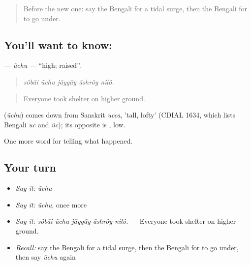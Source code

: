 \label{lesson:BN-C289-uchu}



\begin{quote}
Before the new one: say the Bengali for a tidal surge, then the Bengali for to go under.
\end{quote}

\subsection*{You'll want to know: }
\textbf{} — \emph{ũchu} — \textquotedblleft{}high; raised\textquotedblright{}.

\begin{quote}
    
\end{quote}

\begin{quote}
\emph{sôbāi ũchu jāygāy āshrôy nilô.}
\end{quote}

\begin{quote}
Everyone took shelter on higher ground.
\end{quote}

\begin{cousinweb}
\textbf{} (\emph{ũchu}) comes down from Sanskrit \emph{ucca}, 'tall, lofty' (CDIAL 1634, which lists Bengali \emph{uc} and \emph{ũc}); its opposite is \textbf{}, low.
\end{cousinweb}

\begin{grammarlens}[title={What you've built}]
One more word for telling what happened.
\end{grammarlens}

\subsection*{Your turn}
\begin{itemize}
\raggedright
  \item \emph{Say it:} \emph{ũchu}
  \item \emph{Say it:} \emph{ũchu}, once more
  \item \emph{Say it:} \emph{sôbāi ũchu jāygāy āshrôy nilô.} — Everyone took shelter on higher ground.
  \item \emph{Recall:} say the Bengali for a tidal surge, then the Bengali for to go under, then say \emph{ũchu} again
\end{itemize}

